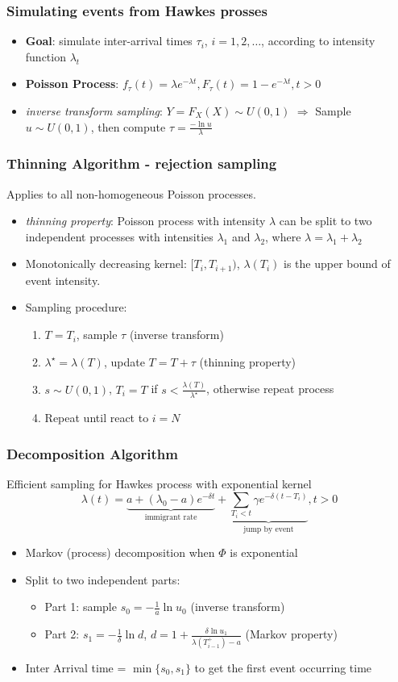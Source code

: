 \documentclass{beamer}
\begin{document}
\begin{frame}
	\frametitle{Simulating events from Hawkes prosses}
	\begin{itemize}
		\item \textbf{Goal}: simulate inter-arrival times $\tau_i$, $i=1,2,\dots$, according to intensity function $\lambda_t$
		\item \textbf{Poisson Process}: $f_{\tau}(t)=\lambda e^{-\lambda t},F_{\tau}(t)=1-e^{-\lambda t} , t>0$
		\item \textit{inverse transform sampling}: $Y=F_X(X) \sim U(0,1)$ $\Rightarrow$ Sample $u\sim U(0,1)$, then compute $\tau=\frac{- \ln u}{\lambda}$
	\end{itemize}
\end{frame}

\begin{frame}
\frametitle{Thinning Algorithm - rejection sampling}
Applies to all non-homogeneous Poisson processes. 
\begin{itemize}
	\item \textit{thinning property}: Poisson process with intensity $\lambda$ can be split to two independent processes with intensities $\lambda_1$ and $\lambda_2$, where $\lambda = \lambda_1+\lambda_2$
	\item Monotonically decreasing kernel: $[T_i,T_{i+1})$, $\lambda(T_i)$ is the upper bound of event intensity.
	\item Sampling procedure:
	\begin{enumerate}
		\item $T=T_i$, sample $\tau$ (inverse transform)
		\item $\lambda^{\star}=\lambda(T)$, update $T=T+\tau$ (thinning property)
		\item $s\sim U(0,1)$, $T_i=T$ if $s<\frac{\lambda(T)}{\lambda^{\star}}$, otherwise repeat process
		\item Repeat until react to $i=N$
	\end{enumerate}
\end{itemize}
\end{frame}

\begin{frame}
\frametitle{Decomposition Algorithm}
Efficient sampling for Hawkes process with exponential kernel
\[\lambda(t)=\underbrace{a+(\lambda_0-a)e^{-\delta t}}_{\text{immigrant rate}}+\underbrace{\sum_{T_i<t}\gamma e^{-\delta(t-T_i)}}_{\text{jump by event}}, t>0 \]
\begin{itemize}
	\item Markov (process) decomposition when $\Phi$ is exponential
	\item Split to two independent parts:
	\begin{itemize}
		\item Part 1: sample $s_0=-\frac{1}{a}\ln u_0$ (inverse transform)
	\item Part 2: $s_1=-\frac{1}{\delta}\ln d$, $d=1+\frac{\delta \ln u_1}{\lambda(T^+_{i-1})-a}$ (Markov property)
	\end{itemize}
	\item Inter Arrival time = $\min\{s_0,s_1\}$ to get the first event occurring time
\end{itemize}
\end{frame}
\end{document}
